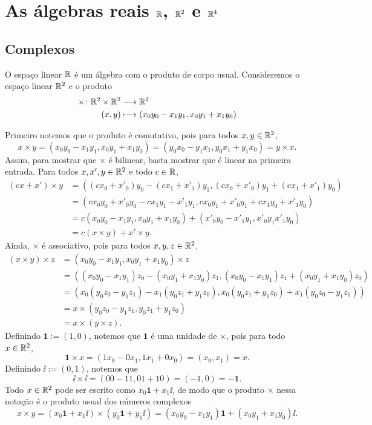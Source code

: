 \section{As álgebras reais $\mathbb{R}$, $\mathbb{R}^2$ e $\mathbb{R}^4$}

\subsection{Complexos}

O espaço linear $\mathbb{R}$ é um álgebra com o produto de corpo usual. Consideremos o espaço linear $\mathbb{R}^2$ e o produto
	\begin{align*}
	{\times}\colon {\mathbb{R}^2 \times \mathbb{R}^2} &\longrightarrow {\mathbb{R}^2} \\{(x,y)} &\longmapsto (x_0y_0-x_1y_1,x_0y_1+x_1y_0)
	\end{align*}

Primeiro notemos que o produto é comutativo, pois para todos $x,y \in \mathbb{R}^2$,
	\begin{equation*}
	x \times y = (x_0y_0-x_1y_1,x_0y_1+x_1y_0) = (y_0x_0-y_1x_1,y_0x_1+y_1x_0) = y \times x.
	\end{equation*}
Assim, para mostrar que $\times$ é bilinear, basta mostrar que é linear na primeira entrada. Para todos $x,x',y \in \mathbb{R}^2$ e todo $c \in \mathbb{R}$,
	\begin{align*}
	(cx+x') \times y &= ((cx_0+x'_0)y_0-(cx_1+x'_1)y_1,(cx_0+x'_0)y_1+(cx_1+x'_1)y_0) \\
		&= (cx_0y_0+x'_0y_0-cx_1y_1-x'_1y_1,cx_0y_1+x'_0y_1+cx_1y_0+x'_1y_0) \\
		&= c(x_0y_0-x_1y_1,x_0y_1+x_1y_0) + (x'_0y_0-x'_1y_1,x'_0y_1x'_1y_0) \\
		&= c (x \times y) + x' \times y.
	\end{align*}
Ainda, $\times$ é associativo, pois para todos $x,y,z \in \mathbb{R}^2$,
	\begin{align*}
	(x \times y) \times z &= (x_0y_0-x_1y_1,x_0y_1+x_1y_0) \times z \\
		&= ((x_0y_0-x_1y_1)z_0 - (x_0y_1+x_1y_0)z_1 , (x_0y_0-x_1y_1)z_1 + (x_0y_1+x_1y_0)z_0 ) \\
		&= (x_0(y_0z_0-y_1z_1)-x_1(y_0z_1+y_1z_0),x_0(y_0z_1+y_1z_0)+x_1(y_0z_0-y_1z_1)) \\
		&= x \times (y_0z_0-y_1z_1,y_0z_1+y_1z_0) \\
		&= x \times (y \times z).
	\end{align*}
Definindo $\bm 1 := (1,0)$, notemos que $\bm 1$ é uma unidade de $\times$, pois para todo $x \in \mathbb{R}^2$,
	\begin{equation*}
	\bm 1 \times x = (1x_0-0x_1,1x_1+0x_0) = (x_0,x_1) = x.
	\end{equation*}
Definindo $\bm \ii := (0,1)$, notemos que
	\begin{equation*}
	\bm \ii \times \bm \ii = (00-11,01+10) = (-1,0) = -\bm 1.
	\end{equation*}
Todo $x \in \mathbb{R}^2$ pode ser escrito como $x_0\bm 1 + x_1 \bm \ii$, de modo que o produto $\times$ nessa notação é o produto usual dos números complexos
	\begin{equation*}
	x \times y = (x_0\bm 1 + x_1 \bm \ii) \times (y_0\bm 1 + y_1 \bm \ii) = (x_0y_0-x_1y_1)\bm 1 + (x_0y_1+x_1y_0)\bm \ii.
	\end{equation*}

